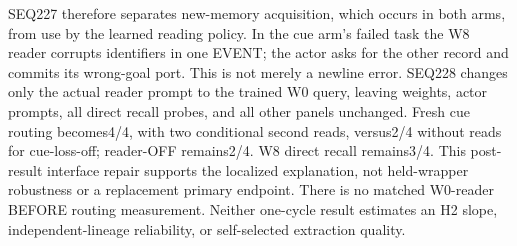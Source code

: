 \documentclass{article}
\begin{document}
SEQ227 therefore separates new-memory acquisition, which occurs in both arms,
from use by the learned reading policy. In the cue arm's failed task the W8
reader corrupts identifiers in one EVENT; the actor asks for the other record
and commits its wrong-goal port. This is not merely a newline error.
SEQ228 changes only the actual reader prompt to the trained W0 query, leaving
weights, actor prompts, all direct recall probes, and all other panels unchanged.
Fresh cue routing becomes4/4, with two conditional second reads, versus2/4
without reads for cue-loss-off; reader-OFF remains2/4. W8 direct recall remains3/4.
This post-result interface repair supports the localized explanation, not
held-wrapper robustness or a replacement primary endpoint. There is no matched
W0-reader BEFORE routing measurement. Neither one-cycle result estimates an
H2 slope, independent-lineage reliability, or self-selected extraction quality.
\end{document}
